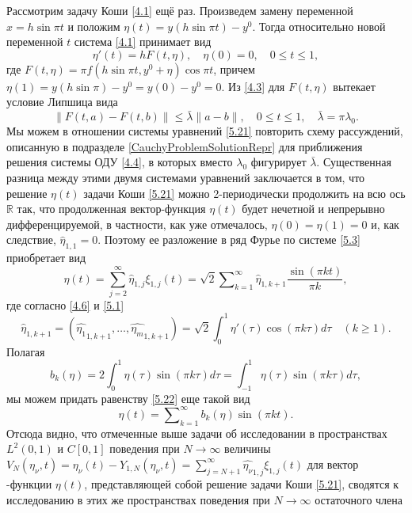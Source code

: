 Рассмотрим задачу Коши \eqref{4.1} ещё раз.  Произведем замену переменной $x=h\sin\pi t$ и положим $\eta(t)=y(h\sin\pi t)-y^0$. Тогда относительно новой переменной $t$ система \eqref{4.1} принимает вид
\begin{equation}\label{5.21}
\eta'(t)=hF(t,\eta), \quad \eta(0)=0,\quad 0\le t\le1,
\end{equation}
где $F(t,\eta)=\pi f(h\sin \pi t,y^0+\eta)\cos\pi t$, причем $\eta(1)=y(h\sin\pi)-y^0=y(0)-y^0=0$. Из \eqref{4.3} для $F(t,\eta)$ вытекает условие Липшица вида
\begin{equation*}
\|F(t,a)-F(t,b)\|\le \bar\lambda\|a-b\|, \quad 0\le t \le 1, \quad\bar\lambda=\pi\lambda_0.
\end{equation*}
Мы можем  в отношении системы уравнений \eqref{5.21} повторить схему рассуждений, описанную в подразделе \ref{CauchyProblemSolutionRepr}  для приближения решения системы ОДУ \eqref{4.4}, в которых вместо $\lambda_0$  фигурирует $\bar\lambda$.  Существенная разница между этими двумя системами уравнений заключается в том, что решение $\eta(t)$ задачи Коши \eqref{5.21} можно   2-периодически продолжить на всю ось $\mathbb{R}$ так, что продолженная вектор-функция $\eta(t)$ будет нечетной и непрерывно дифференцируемой, в частности, как уже отмечалось,  $\eta(0)=\eta(1)=0$ и, как следствие, $\hat\eta_{1,1}=0$. Поэтому ее разложение  в ряд Фурье по системе \eqref{5.3} приобретает вид
\begin{equation}\label{5.22}
\eta(t)=\sum_{j=2}^\infty \hat\eta_{1,j}\xi_{1,j}(t)=\sqrt{2} \sum\nolimits_{k=1}^\infty \hat \eta_{1,k+1}\frac{\sin(\pi kt)}{\pi k},
\end{equation}
где согласно  \eqref{4.6} и \eqref{5.1}
\begin{equation}\label{5.23}
\hat \eta_{1,k+1}=(\widehat{\eta_1}_{1,k+1},\ldots,\widehat{\eta_m}_{1,k+1})=\sqrt{2}\int_{0}^1 \eta'(\tau)\cos(\pi k\tau)d\tau\quad(k\ge1).
\end{equation}
Полагая
\begin{equation}\label{5.24}
b_k(\eta)=2\int_{0}^1 \eta(\tau)\sin(\pi k\tau)d\tau=\int_{-1}^1 \eta(\tau)\sin(\pi k\tau)d\tau,
\end{equation}
мы можем придать равенству \eqref{5.22}  еще такой вид
\begin{equation}\label{5.25}
\eta(t)=\sum\nolimits_{k=1}^\infty b_k(\eta)\sin(\pi kt).
\end{equation}
Отсюда видно, что отмеченные выше задачи об исследовании в пространствах $L^2(0,1)$ и $C[0,1]$ поведения при $N\to\infty$  величины $ V_N(\eta_\nu,t)= \eta_\nu(t)-Y_{1,N}(\eta_\nu,t)=\sum_{j=N+1}^\infty \widehat{\eta_\nu}_{1,j}\xi_{1,j}(t)$ для вектор -функции $\eta(t)$, представляющей собой решение задачи Коши \eqref{5.21},     сводятся  к исследованию в этих же пространствах поведения при $N\to\infty$ остаточного члена
